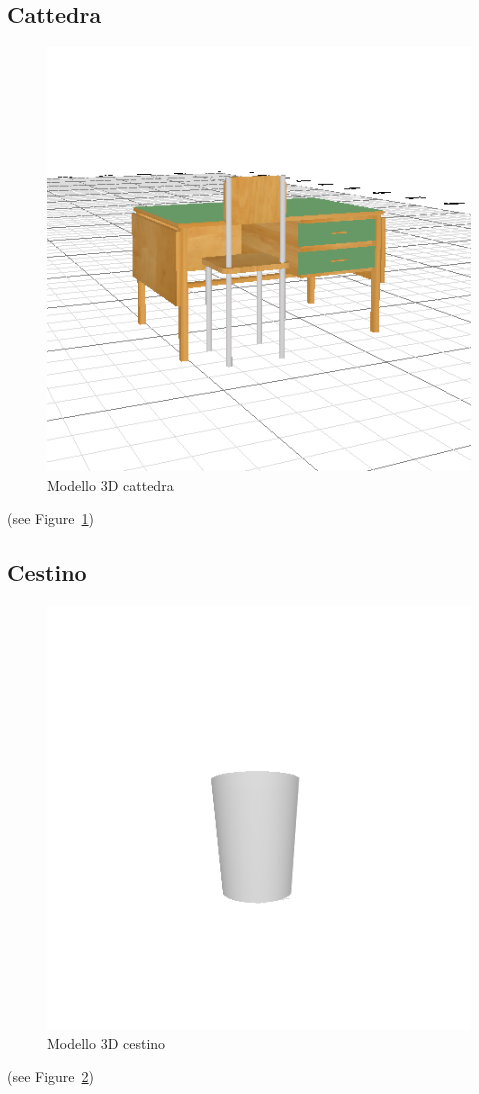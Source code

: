 \subsection*{Cattedra}
\begin{figure}[htbp] %
   \centering
   \includegraphics[width=0.5\linewidth]{images/cattedra2}
   \caption{Modello 3D cattedra}
   \label{fig:cattedra}
   \end{figure}
   (see Figure~\ref{fig:cattedra})
   \newpage

\subsection*{Cestino}
\begin{figure}[htbp] %
   \centering
   \includegraphics[width=0.5\linewidth]{images/cestino}
   \caption{Modello 3D cestino}
   \label{fig:cestino}
   \end{figure}
   (see Figure~\ref{fig:cestino})
   \newpage

